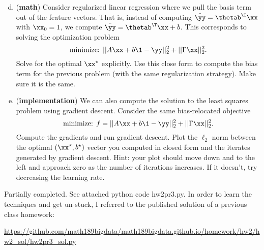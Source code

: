 \documentclass[12pt,letterpaper]{hmcpset}
\begin{document}
\begin{problem}[3 (continued)]
\begin{enumerate}[(a)]
	\setcounter{enumi}{3}
\item (\textbf{math}) Consider regularized linear regression where we pull the
basis term out of the feature vectors. That is, instead of computing $\hat\yy
= \thetab^\T\xx$ with $\xx_0 = 1$, we compute $\hat\yy = \thetab^\T\xx + b$.
This corresponds to solving the optimization problem
\[
\text{minimize: } ||A\xx + b\1 - \yy||_2^2 + ||\Gamma\xx||_2^2.
\]
Solve for the optimal $\xx^\star$ explicitly. Use this close form to compute the
bias term for the previous problem (with the same regularization strategy). Make
sure it is the same.
\newline
\item (\textbf{implementation}) We can also compute the solution to the least squares
problem using gradient descent. Consider the same bias-relocated objective
\[
\text{minimize: } f = ||A\xx + b\1 - \yy||_2^2 + ||\Gamma\xx||_2^2.
\]
Compute the gradients and run gradient descent. Plot the $\ell_2$ norm
between the optimal $(\xx^\star, b^\star)$ vector you computed in closed form
and the iterates generated by gradient descent. Hint: your plot should move
down and to the left and approach zero as the number of iterations increases. If
it doesn't, try decreasing the learning rate.
\end{enumerate}
\end{problem}
\begin{solution}

  Partially completed.  See attached python code hw2pr3.py.
  In order to learn the techniques and get un-stuck, I referred to the published
  solution of a previous class homework:

  \url{https://github.com/math189bigdata/math189bigdata.github.io/homework/hw2/hw2_sol/hw2pr3_sol.py}

	\vfill
\end{solution}
\newpage
\end{document}
